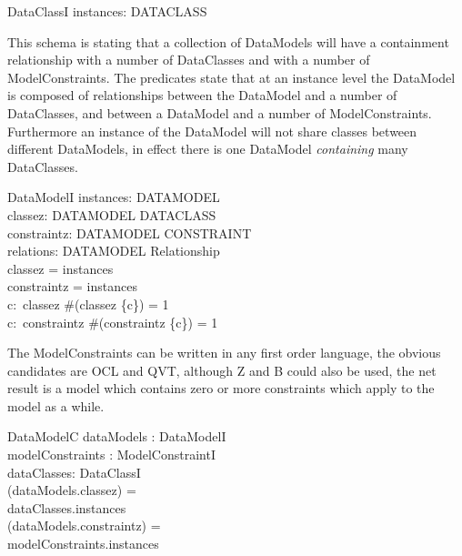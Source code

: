 \documentclass[a4paper,twoside]{article}
\begin{document}
\begin{schema}{DataClassI}
	instances: \finset DATACLASS\\
\end{schema}

This schema is stating that a collection of DataModels will have a containment relationship with a number of DataClasses and with a number of ModelConstraints.  The predicates state that at an instance level the DataModel is composed of relationships between the DataModel and a number of DataClasses, and between a DataModel and a number of ModelConstraints. Furthermore an instance of the DataModel will not share classes between different DataModels, in effect there is one DataModel \emph{containing} many DataClasses.

\begin{schema}{DataModelI}
	instances: \power DATAMODEL \\
	classez: DATAMODEL \rel DATACLASS \\
	constraintz:  DATAMODEL \rel CONSTRAINT \\
	relations: DATAMODEL \pfun Relationship \\
	\where
	\dom classez = instances \\
	\dom constraintz = instances \\
	\forall c:~\ran classez \spot \#(classez \rres\{c\}) = 1 \\
	\forall c:~\ran constraintz \spot \#(constraintz \rres\{c\}) = 1\\
\end{schema}



The ModelConstraints can be written in any first order language, the obvious candidates are OCL and QVT, although Z and B could also be used, the net result is a model which contains zero or more constraints which apply to the model as a while.

\begin{schema}{DataModelC}
	dataModels : DataModelI \\
	modelConstraints : ModelConstraintI \\
	dataClasses: DataClassI \\
	\where
	\ran(dataModels.classez) = \\ dataClasses.instances \\
	\ran(dataModels.constraintz) = \\ modelConstraints.instances
\end{schema}
\end{document}
